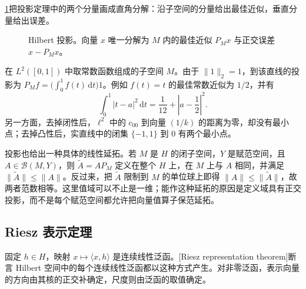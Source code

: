 \cref{b1:fig:hilbert-orthogonal-projection}把投影定理中的两个分量画成直角分解：沿子空间的分量给出最佳近似，垂直分量给出误差。
\begin{figure}[htbp]
  \centering
  \caption[Hilbert 投影]{Hilbert 投影。向量 \(x\) 唯一分解为 \(M\) 内的最佳近似 \(P_Mx\) 与正交误差 \(x-P_Mx\)。}
  \label{b1:fig:hilbert-orthogonal-projection}
\end{figure}

在 \(L^2([0,1])\) 中取常数函数组成的子空间 \(M\)。由于 \(\|1\|_2=1\)，到该直线的投影为 \(P_Mf=\bigl(\int_0^1f(t)\,\mathrm dt\bigr)1\)。例如 \(f(t)=t\) 的最佳常数近似为 \(1/2\)，并有
\[
\int_0^1|t-a|^2\,\mathrm dt=\dfrac1{12}+\left|a-\dfrac12\right|^2.
\]
另一方面，去掉闭性后，\(\ell^2\) 中的 \(c_{00}\) 到向量 \((1/k)\) 的距离为零，却没有最小点；去掉凸性后，实直线中的闭集 \(\{-1,1\}\) 到 \(0\) 有两个最小点。

\ProseParagraphBreak

投影也给出一种具体的线性延拓。若 \(M\) 是 \(H\) 的闭子空间，\(Y\) 是赋范空间，且 \(A\in\mathcal B(M,Y)\)，则 \(\widetilde A=AP_M\) 定义在整个 \(H\) 上，在 \(M\) 上与 \(A\) 相同，并满足 \(\|\widetilde A\|\leq\|A\|\)。反过来，把 \(\widetilde A\) 限制到 \(M\) 的单位球上即得 \(\|A\|\leq\|\widetilde A\|\)，故两者范数相等。这里值域可以不止是一维；能作这种延拓的原因是定义域具有正交投影，而不是每个赋范空间都允许把向量值算子保范延拓。

\subsection{Riesz 表示定理}
\label{b1:subsec:080403}

固定 \(h\in H\)，映射 \(x\mapsto\langle x,h\rangle\) 是连续线性泛函。[Riesz representation theorem]断言 Hilbert 空间中的每个连续线性泛函都以这种方式产生。对非零泛函，表示向量的方向由其核的正交补确定，尺度则由泛函的取值确定。

